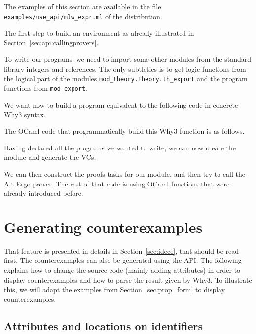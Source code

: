 The examples of this section are available in the file
\verb|examples/use_api/mlw_expr.ml| of the distribution.

The first step to build an environment as already illustrated in
Section~\ref{sec:api:callingprovers}.


To write our programs, we need to import some other modules from the
standard library integers and references. The only subtleties is to get logic
functions from the logical part of the modules
\verb|mod_theory.Theory.th_export| and the program functions from \verb|mod_export|.


We want now to build a program equivalent to the following code in concrete Why3 syntax.


The OCaml code that programmatically build this Why3 function is as follows.


Having declared all the programs we wanted to write, we can now create the
module and generate the VCs.


We can then construct the proofs tasks for our module, and then try to
call the Alt-Ergo prover. The rest of that code is using OCaml
functions that were already introduced before.


\section{Generating counterexamples}
\label{sec:ce_api}

That feature is presented in details in Section~\ref{sec:idece}, that
should be read first.  The counterexamples can also be generated using
the API. The following explains how to change the source code (mainly
adding attributes) in order to display counterexamples and how to
parse the result given by Why3.  To illustrate this, we will adapt the
examples from Section~\ref{sec:prop_form} to display counterexamples.

\subsection{Attributes and locations on identifiers}


